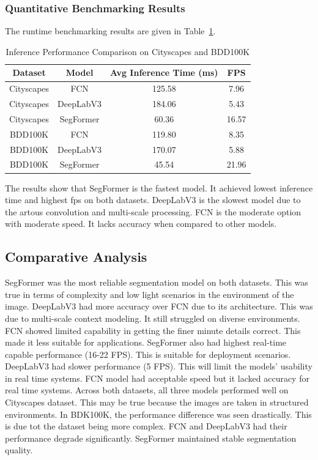 \documentclass[10pt,journal,compsoc]{IEEEtran}
\begin{document}
\subsubsection{Quantitative Benchmarking Results}
The runtime benchmarking results are given in Table~\ref{tab:inference_comparison}.
\begin{table}[!htbp]
\caption{Inference Performance Comparison on Cityscapes and BDD100K}
\centering
\begin{tabular}{|c|c|c|c|}
\hline
\textbf{Dataset} & \textbf{Model} & \textbf{Avg Inference Time (ms)} & \textbf{FPS} \\
\hline
Cityscapes & FCN       & 125.58 & 7.96  \\
Cityscapes & DeepLabV3 & 184.06 & 5.43  \\
Cityscapes & SegFormer & 60.36  & 16.57 \\
\hline
BDD100K    & FCN       & 119.80 & 8.35  \\
BDD100K    & DeepLabV3 & 170.07 & 5.88  \\
BDD100K    & SegFormer & 45.54  & 21.96 \\
\hline
\end{tabular}
\label{tab:inference_comparison}
\end{table}

The results show that SegFormer is the fastest model. It achieved lowest inference time and highest fps on both datasets. DeepLabV3 is the slowest model due to the artous convolution and multi-scale processing. FCN is the moderate option with moderate speed. It lacks accuracy when compared to other models.

\subsection{Comparative Analysis}
SegFormer was the most reliable segmentation model on both datasets. This was true in terms of complexity and low light scenarios in the environment of the image. DeepLabV3 had more accuracy over FCN due to its architecture. This was due to multi-scale context modeling. It still struggled on diverse environments. FCN showed limited capability in getting the finer minute details correct. This made it less suitable for applications. SegFormer also had highest real-time capable performance (16-22 FPS). This is suitable for deployment scenarios. DeepLabV3 had slower performance (5 FPS). This will limit the models' usability in real time systems. FCN model had acceptable speed but it lacked accuracy for real time systems. Across both datasets, all three models performed well on Cityscapes dataset. This may be true because the images are taken in structured environments. In BDK100K, the performance difference was seen drastically. This is due tot the dataset being more complex. FCN and DeepLabV3 had their performance degrade significantly. SegFormer maintained stable segmentation quality.
\end{document}
